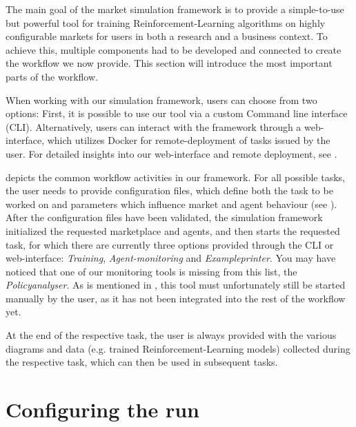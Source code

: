 \begin{jointwork}\label{ch:OurWorkflow}
	The main goal of the market simulation framework is to provide a simple-to-use but powerful tool for training Reinforcement-Learning algorithms on highly configurable markets for users in both a research and a business context. To achieve this, multiple components had to be developed and connected to create the workflow we now provide. This section will introduce the most important parts of the workflow.
\end{jointwork}

When working with our simulation framework, users can choose from two options: First, it is possible to use our tool via a custom Command line interface (CLI). Alternatively, users can interact with the framework through a web-interface, which utilizes Docker for remote-deployment of tasks issued by the user. For detailed insights into our web-interface and remote deployment, see \cite{JudithThesis}.

 depicts the common workflow activities in our framework. For all possible tasks, the user needs to provide configuration files, which define both the task to be worked on and parameters which influence market and agent behaviour (see ). After the configuration files have been validated, the simulation framework initialized the requested marketplace and agents, and then starts the requested task, for which there are currently three options provided through the CLI or web-interface: \emph{Training}, \emph{Agent-monitoring} and \emph{Exampleprinter}. You may have noticed that one of our monitoring tools is missing from this list, the \emph{Policyanalyser}. As is mentioned in , this tool must unfortunately still be started manually by the user, as it has not been integrated into the rest of the workflow yet.

At the end of the respective task, the user is always provided with the various diagrams and data (e.g. trained Reinforcement-Learning models) collected during the respective task, which can then be used in subsequent tasks.

\section{Configuring the run}\label{sec:ConfigureRun}

